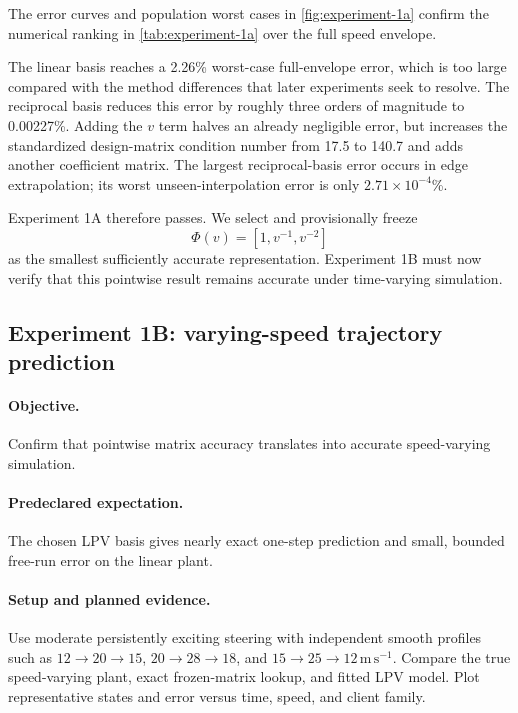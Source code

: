 The error curves and population worst cases in \cref{fig:experiment-1a} confirm
the numerical ranking in \cref{tab:experiment-1a} over the full speed envelope.

The linear basis reaches a 2.26\% worst-case full-envelope error, which is too
large compared with the method differences that later experiments seek to
resolve.  The reciprocal basis reduces this error by roughly three orders of
magnitude to 0.00227\%.  Adding the $v$ term halves an already negligible error,
but increases the standardized design-matrix condition number from 17.5 to
140.7 and adds another coefficient matrix.  The largest reciprocal-basis error
occurs in edge extrapolation; its worst unseen-interpolation error is only
$2.71\times10^{-4}$\%.

Experiment 1A therefore passes.  We select and provisionally freeze
\begin{equation}
 \boxed{\Phi(v)=[1,v^{-1},v^{-2}]}
\end{equation}
as the smallest sufficiently accurate representation.  Experiment 1B must now
verify that this pointwise result remains accurate under time-varying simulation.

\subsection{Experiment 1B: varying-speed trajectory prediction}
\paragraph{Objective.}
Confirm that pointwise matrix accuracy translates into accurate speed-varying
simulation.

\paragraph{Predeclared expectation.}
The chosen LPV basis gives nearly exact one-step prediction and small, bounded
free-run error on the linear plant.

\paragraph{Setup and planned evidence.}
Use moderate persistently exciting steering with independent smooth profiles such
as $12\rightarrow20\rightarrow15$, $20\rightarrow28\rightarrow18$, and
$15\rightarrow25\rightarrow12\,\mathrm{m\,s^{-1}}$. Compare the true
speed-varying plant, exact frozen-matrix lookup, and fitted LPV model. Plot
representative states and error versus time, speed, and client family.

